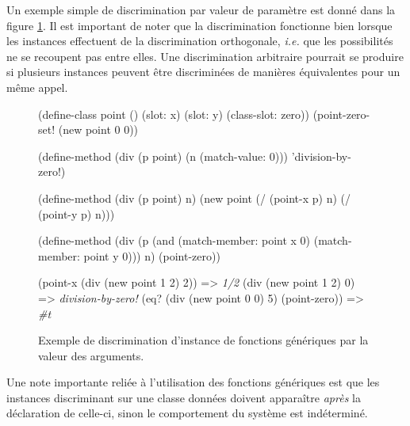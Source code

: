 \documentclass[12pt,oneside,letterpaper,francais]{book}
\newcommand{\ie}{{\textit{i.e. }}}
\newcommand{\schemeresult}[1]{{\it #1}}
\begin{document}
Un exemple simple de discrimination par valeur de paramètre est donné
dans la figure \ref{OO:genfun-val-dispatch}. Il est important de noter
que la discrimination fonctionne bien lorsque les instances effectuent
de la discrimination orthogonale, \ie que les possibilités ne se
recoupent pas entre elles. Une discrimination arbitraire pourrait se
produire si plusieurs instances peuvent être discriminées de manières
équivalentes pour un même appel.

\begin{figure}[htb!]
  \begin{schemecode}
(define-class point () (slot: x) (slot: y) (class-slot: zero))
(point-zero-set! (new point 0 0))

(define-method (div (p point) (n (match-value: 0)))
  'division-by-zero!)

(define-method (div (p point) n)
  (new point (/ (point-x p) n) (/ (point-y p) n)))

(define-method (div (p (and (match-member: point x 0)
                            (match-member: point y 0)))
                    n)
  (point-zero))

(point-x (div (new point 1 2) 2))          => \schemeresult{1/2}
(div (new point 1 2) 0)                    => \schemeresult{division-by-zero!}
(eq? (div (new point 0 0) 5) (point-zero)) => \schemeresult{\#t}
  \end{schemecode}
  \caption{Exemple de discrimination d'instance de fonctions
    génériques par la valeur des arguments.}
  \label{OO:genfun-val-dispatch}
\end{figure}


Une note importante reliée à l'utilisation des fonctions génériques
est que les instances discriminant sur une classe données doivent
apparaître \emph{après} la déclaration de celle-ci, sinon le
comportement du système est indéterminé.
\end{document}
